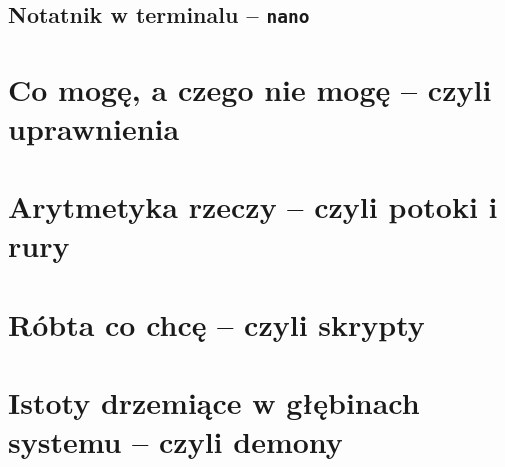 \documentclass[12pt]{article}
\newcommand{\ttbf}[1]{
    \texttt{\textbf{#1}}
}
\begin{document}
\subsection{Notatnik w terminalu -- \ttbf{nano}}

\section{Co mogę, a czego nie mogę -- czyli uprawnienia}
\label{sec:perms}

\section{Arytmetyka rzeczy -- czyli potoki i rury}

\section{Róbta co chcę -- czyli skrypty}

\section{Istoty drzemiące w głębinach systemu -- czyli demony}
\end{document}
